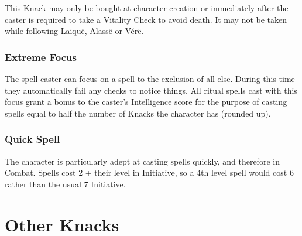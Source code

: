 \begin{multicols}{2}
This Knack may only be bought at character creation or immediately after the caster is required to take a Vitality Check to avoid death. It may not be taken while following Laiqu\"{e}, Alass\"{e} or V\'{e}r\"{e}.

\subsubsection{Extreme Focus}

The spell caster can focus on a spell to the exclusion of all else. During this time they automatically fail any checks to notice things. All ritual spells cast with this focus grant a bonus to the caster's Intelligence score for the purpose of casting spells equal to half the number of Knacks the character has (rounded up).

\subsubsection{Quick Spell}

The character is particularly adept at casting spells quickly, and therefore in Combat. Spells cost 2 + their level in Initiative, so a 4th level spell would cost 6 rather than the usual 7 Initiative.

\end{multicols}

\section{Other Knacks}

